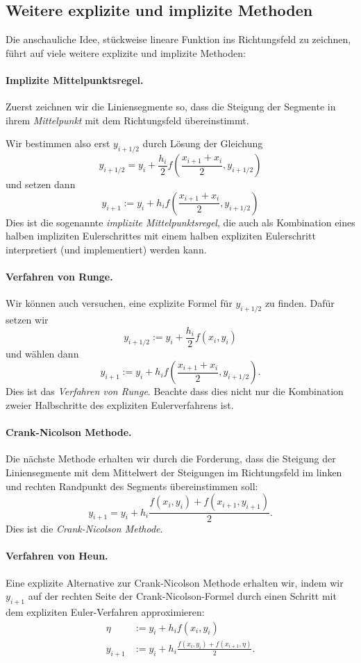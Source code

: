 \documentclass[12pt,a4paper]{book}
\theoremstyle{break}
\theoremstyle{nonumberplain}
\newcommand{\1}{\mathbbm{1}} 			      	%
\begin{document}
\subsection{Weitere explizite und implizite Methoden}\label{subsect:More_ex_and_im_methods}

Die anschauliche Idee, stückweise lineare Funktion ins Richtungsfeld zu zeichnen, führt auf 
viele weitere explizite und implizite Methoden:

\paragraph{Implizite Mittelpunktsregel.}
Zuerst zeichnen wir die Liniensegmente so, dass die Steigung der Segmente in ihrem \emph{Mittelpunkt}
mit dem Richtungsfeld übereinstimmt.

Wir bestimmen also erst $y_{i+1/2}$ durch Lösung der Gleichung
\[
y_{i+1/2}  =y_i+\frac{h_i}{2} f\left( \frac{x_{i+1}+x_i}{2},y_{i+1/2} \right)
\]
und setzen dann
\[
y_{i+1}:=y_i+ h_i  f\left( \frac{x_{i+1}+x_i}{2},y_{i+1/2} \right)
\]
Dies ist die sogenannte \emph{implizite Mittelpunktsregel}, die auch als Kombination eines
halben impliziten Eulerschrittes mit einem halben expliziten Eulerschritt interpretiert (und implementiert) 
werden kann.

\paragraph{Verfahren von Runge.}
Wir können auch versuchen, eine explizite Formel für $y_{i+1/2}$ zu finden. Dafür setzen wir
\[
y_{i+1/2}  :=y_i+\frac{h_i}{2} f(x_i,y_i)
\]
und wählen dann
\[
y_{i+1}:=y_i+ h_i  f\left( \frac{x_{i+1}+x_i}{2},y_{i+1/2} \right).
\]
Dies ist das \emph{Verfahren von Runge}. Beachte dass dies nicht nur die Kombination 
zweier Halbschritte des expliziten Eulerverfahrens ist.

\paragraph{Crank-Nicolson Methode.}
Die nächste Methode erhalten wir durch die Forderung, dass die Steigung der Liniensegmente mit dem Mittelwert
der Steigungen im Richtungsfeld im linken und rechten Randpunkt des Segments übereinstimmen soll:
\[
y_{i+1} = y_i+h_i \frac{f(x_{i},y_{i})+f(x_{i+1},y_{i+1})}{2}.
\]
Dies ist die \emph{Crank-Nicolson Methode}.

\paragraph{Verfahren von Heun.}
Eine explizite Alternative zur Crank-Nicolson Methode erhalten wir, indem wir $y_{i+1}$ auf der rechten Seite 
der Crank-Nicolson-Formel durch einen Schritt mit dem expliziten Euler-Verfahren approximieren:
\begin{align*}
\eta & :=y_i+h_i f(x_i,y_i)\\
y_{i+1} &:= y_i+h_i \frac{f(x_{i},y_{i})+f(x_{i+1},\eta)}{2}.
\end{align*}
\end{document}
